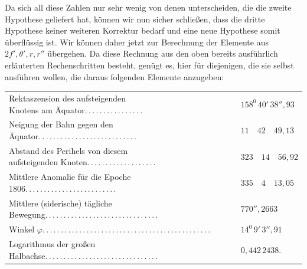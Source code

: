 Da sich all diese Zahlen nur sehr wenig von denen unterscheiden, die die zweite Hypothese geliefert hat, können wir nun sicher schließen, dass die dritte Hypothese keiner weiteren Korrektur bedarf und eine neue Hypothese somit überflüssig ist. Wir können daher jetzt zur Berechnung der Elemente aus $2f',\theta',r,r''$ übergehen. Da diese Rechnung aus den oben bereits ausführlich erläuterten Rechenschritten besteht, genügt es, hier für diejenigen, die sie selbst ausführen wollen, die daraus folgenden Elemente anzugeben:
\begin{center}\begingroup\footnotesize\setlength{\tabcolsep}{3pt}\renewcommand{\arraystretch}{1.3}
\begin{tabular}{ll}
\shortstack[l]{Rektaszension des aufsteigenden\\Knotens am Äquator\quad .\,.\,.\,.\,.\,.\,.\,.\,.\,.\,.\,.\,.\,.\,.\,.} & $158^0\,40'\,38''{,}93$\\
Neigung der Bahn gegen den Äquator\quad .\,.\,.\,.\,.\,.\,.\,.\,.\,.\,.\,.\,.\,.\,.\,.\,.\,.\,.\,.\,.\,.\,.\,.\,.\,.\,. & $11\quad42\quad49{,}13$\\
\shortstack[l]{Abstand des Perihels von diesem\\aufsteigenden Knoten\quad .\,.\,.\,.\,.\,.\,.\,.\,.\,.\,.\,.\,.\,.\,.\,.\,.\,.\,.} & $323\quad14\quad56{,}92$\\
Mittlere Anomalie für die Epoche 1806\quad .\,.\,.\,.\,.\,.\,.\,.\,.\,.\,.\,.\,.\,.\,.\,.\,.\,.\,.\,.\,.\,.\,.\,.\,. & $335\quad4\quad13{,}05$\\
Mittlere (siderische) tägliche Bewegung\quad .\,.\,.\,.\,.\,.\,.\,.\,.\,.\,.\,.\,.\,.\,.\,.\,.\,.\,.\,.\,.\,.\,.\,.\,.\,.\,.\,.\,.\,.\,. & $770''{,}2663$\\
Winkel $\varphi$\quad .\,.\,.\,.\,.\,.\,.\,.\,.\,.\,.\,.\,.\,.\,.\,.\,.\,.\,.\,.\,.\,.\,.\,.\,.\,.\,.\,.\,.\,.\,.\,.\,.\,.\,.\,.\,.\,.\,.\,.\,.\,.\,.\,.\,.\,. & $14^0\,9'\,3''{,}91$\\
Logarithmus der großen Halbachse\quad .\,.\,.\,.\,.\,.\,.\,.\,.\,.\,.\,.\,.\,.\,.\,.\,.\,.\,.\,.\,.\,.\,.\,.\,.\,.\,.\,.\,.\,.\,. & $0{,}442\,2438$.
\end{tabular}\endgroup\end{center}
